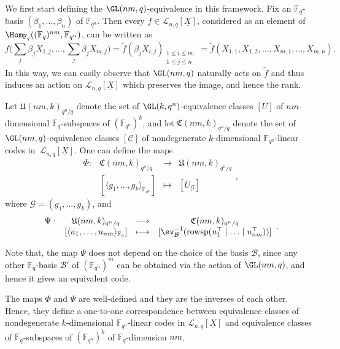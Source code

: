 We first start defining the $\GL(nm,q)$-equivalence in this framework. Fix an $\mathbb{F}_q$-basis $(\beta_1,\ldots,\beta_n)$ of ${\mathbb F}_{q^n}$. Then every $f\in\mathcal{L}_{n,q}[\underline{X}]$, considered as an element of  $\Hom_{\mathbb{F}_q}((\mathbb{F}_q)^{nm},{\mathbb F}_{q^n})$, can be written as  
{\small $$f\Big(\sum_{j}\beta_jX_{1,j},\ldots, \sum_{j}\beta_jX_{m,j}\Big)=\tilde{f}(\beta_jX_{i,j})_{\substack{1\leq i \leq m,\\ 1 \leq j \leq n}}=\tilde{f}(X_{1,1},X_{1,2},\ldots,X_{m,1},\ldots,X_{m,n}).$$}
In this way, we can easily observe that $\GL(nm,q)$ naturally acts on $\tilde{f}$ and  thus induces an action on $\mathcal{L}_{n,q}[\underline{X}]$ which preserves the image, and hence the rank. 

Let $\mathfrak  U(nm,k)_{q^n/q}$ denote the set of $\GL(k,q^n)$-equivalence classes $[U]$ of $nm$-dimensional $\mathbb{F}_q$-subspaces of $(\mathbb{F}_{q^n})^k$, and let $\mathfrak  C(nm,k)_{q^n/q}$ denote the set of $\GL(nm,q)$-equivalence classes $[\mathcal{C}]$ of nondegenerate $k$-dimensional ${\mathbb F}_{q^n}$-linear codes in~$\mathcal{L}_{n,q}[\underline{X}]$. One can define the maps
 $$\begin{array}{rccc}\Phi: & \mathfrak  C(nm,k)_{q^n/q} &\longrightarrow &\mathfrak  U(nm,k)_{q^n/q}\\
 & [\langle g_1,\ldots,g_k\rangle_{{\mathbb F}_{q^n}}] & \longmapsto & [U_{\mathcal G}] \end{array}, $$
where $\mathcal G=(g_1,\ldots,g_k)$,
and 
 $$\begin{array}{rccc}\Psi: & \mathfrak  U(nm,k)_{q^n/q} &\longrightarrow &\mathfrak  C(nm,k)_{q^n/q} \\
 & [\langle u_1, \ldots, u_{nm}\rangle_{\mathbb{F}_q}] & \longmapsto & [\ev_{\mathcal{B}}^{-1}(\mathrm{rowsp}( u_1^\top \mid \ldots \mid u_{nm}^\top))] \end{array}.$$

Note that, the map $\Psi$ does not depend on the choice of the basis $\mathcal{B}$, since any other $\mathbb{F}_q$-basis $\mathcal{B}'$ of $({\mathbb F}_{q^n})^m$ can be obtained via the action of $\GL(nm,q)$, and hence it gives an equivalent code.

 \begin{theorem}\label{thm:correspondence_codes_systems}
  The maps $\Phi$ and $\Psi$ are well-defined and they are the inverses of each other. Hence, they define a one-to-one correspondence between equivalence classes of nondegenerate $k$-dimensional ${\mathbb F}_{q^n}$-linear codes in $\mathcal{L}_{n,q}[\underline{X}]$ and equivalence classes of $\mathbb{F}_q$-subspaces of $(\mathbb{F}_{q^n})^k$ of $\mathbb{F}_q$-dimension $nm$.
 \end{theorem}

